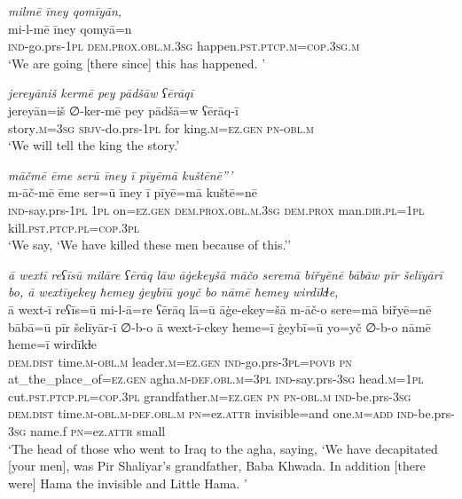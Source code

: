 \ea \label{BP.119}
\textit{milmē īney qomīyān,} \\ 
\gll mi-l-mē īney qomyā=n \\ 
 \textsc{ind-}go.prs\textsc{-\textsc{1pl}} \textsc{dem.prox}\textsc{.obl}\textsc{.m}\textsc{.3sg} happen\textsc{.pst}\textsc{.ptcp}\textsc{.m}\textsc{=cop}\textsc{.3sg}\textsc{.m} \\ 
\glt `We are going [there since] this has happened. '
\z 
 
\ea \label{BP.120}
\textit{jereyāniš kermē pey pādšāw ʕērāqī} \\ 
\gll jereyān=iš ∅-ker-mē pey pādšā=w ʕērāq-ī \\ 
 story\textsc{.m}\textsc{=3sg} \textsc{sbjv-}do.prs\textsc{-\textsc{1pl}} for king\textsc{.m}\textsc{=ez.gen} \textsc{pn}\textsc{-obl}\textsc{.m} \\ 
\glt `We will tell the king the story.'
\z 
 
\ea \label{BP.121}
\textit{māčmē ēme serū īney ī pīyēmā kuštēnē”’} \\ 
\gll m-āč-mē ēme ser=ū īney ī pīyē=mā kuštē=nē \\ 
 \textsc{ind-}say.prs\textsc{-\textsc{1pl}} \textsc{1pl} on\textsc{=ez.gen} \textsc{dem.prox}\textsc{.obl}\textsc{.m}\textsc{.3sg} \textsc{dem.prox} man\textsc{.dir}\textsc{.pl}\textsc{=\textsc{1pl}} kill\textsc{.pst}\textsc{.ptcp}\textsc{.pl}\textsc{=cop}\textsc{.3pl} \\ 
\glt `We say, ‘We have killed these men because of this.’'
\z 
 
\ea \label{BP.122}
\textit{ā wextī reʕīsū milāre ʕērāq lāw āġekeyšā māčo seremā biřyēnē bābāw pīr šelīyārī bo, ā wextīyekey ħemey ġeybīū yoyč bo nāmē ħemey wirdīkɫe,} \\ 
\gll ā wext-ī reʕīs=ū mi-l-ā=re ʕērāq lā=ū āġe-ekey=šā m-āč-o sere=mā biřyē=nē bābā=ū pīr šelīyār-ī ∅-b-o ā wext-ī-ekey ħeme=ī ġeybī=ū yo=yč ∅-b-o nāmē ħeme=ī wirdīkɫe \\ 
 \textsc{dem.dist} time\textsc{.m}\textsc{-obl}\textsc{.m} leader\textsc{.m}\textsc{=ez.gen} \textsc{ind-}go.prs\textsc{-3pl}\textsc{=\textsc{povb}} \textsc{pn} at\_the\_place\_of\textsc{=ez.gen} agha\textsc{.m}\textsc{-def}\textsc{.obl}\textsc{.m}\textsc{=3pl} \textsc{ind-}say.prs\textsc{-3sg} head\textsc{.m}\textsc{=\textsc{1pl}} cut\textsc{.pst}\textsc{.ptcp}\textsc{.pl}\textsc{=cop}\textsc{.3pl} grandfather\textsc{.m}\textsc{=ez.gen} \textsc{pn} \textsc{pn}\textsc{-obl}\textsc{.m} \textsc{ind-}be.prs\textsc{-3sg} \textsc{dem.dist} time\textsc{.m}\textsc{-obl}\textsc{.m}\textsc{-def}\textsc{.obl}\textsc{.m} \textsc{pn}=ez.\textsc{attr} invisible=and one\textsc{.m}\textsc{=add} \textsc{ind-}be.prs\textsc{-3sg} name.f \textsc{pn}=ez.\textsc{attr} small \\ 
\glt `The head of those who went to Iraq to the agha, saying, ‘We have decapitated [your men], was Pir Shaliyar’s grandfather, Baba Khwada. In addition [there were] Hama the invisible and Little Hama. '
\z 
 
